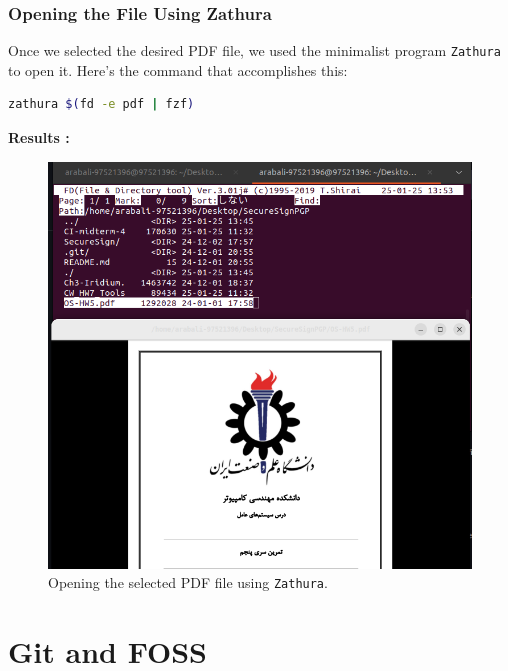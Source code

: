\documentclass[12pt]{article}
\begin{document}
            \subsubsection{Opening the File Using Zathura}
                
                Once we selected the desired PDF file, we used the minimalist program \texttt{Zathura} to open it. Here’s the command that accomplishes this:
                
                \begin{lstlisting}[language=bash]
                zathura $(fd -e pdf | fzf)
                \end{lstlisting}
                
                \newpage
                \textbf{Results :}
                
                \begin{figure}[H]
                    \centering
                    \includegraphics[width=\textwidth]{assets/pictures/find_and_open_desired_pdf.png}
                    \caption{Opening the selected PDF file using \texttt{Zathura}.}
                \end{figure}
            
                \vspace{1cm}

\section{Git and FOSS}
\end{document}

